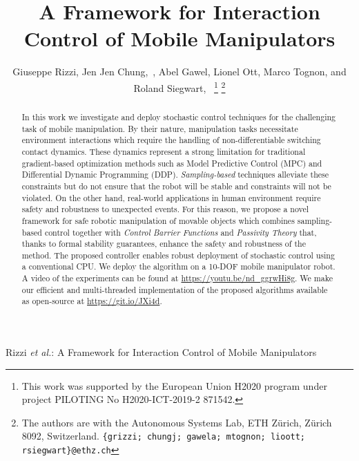 \documentclass[journal]{IEEEtran}  %
\begin{document}
\title{
A Framework for Interaction Control of Mobile Manipulators
}


\author{Giuseppe Rizzi, Jen Jen Chung,~, Abel Gawel, Lionel Ott, Marco Tognon, and Roland Siegwart,~%
\thanks{This work was supported by the European Union H2020 program under project PILOTING No H2020-ICT-2019-2 871542.}
\thanks{The authors are with the Autonomous Systems Lab, ETH Z\"urich, Z\"urich 8092, Switzerland. {\tt\small\{grizzi; chungj; gawela; mtognon; lioott; rsiegwart\}@ethz.ch}}%
}

%                              
{Rizzi \MakeLowercase{\textit{et al.}}: A Framework for Interaction Control of Mobile Manipulators}




\maketitle


\begin{abstract}

In this work we investigate and deploy stochastic control techniques for the challenging task of mobile manipulation. By their nature, manipulation tasks necessitate environment interactions which require the handling of non-differentiable switching contact dynamics. These dynamics represent a strong limitation for traditional gradient-based optimization methods such as Model Predictive Control (MPC) and Differential Dynamic Programming (DDP). \emph{Sampling-based} techniques alleviate these constraints but do not ensure that the robot will be stable and constraints will not be violated. On the other hand, real-world applications in human environment require safety and robustness to unexpected events. For this reason, we propose a novel framework for safe robotic manipulation of movable objects which combines sampling-based control together with \emph{Control Barrier Functions} and \emph{Passivity Theory} that, thanks to formal stability guarantees, enhance the safety and robustness of the method. The proposed controller enables robust deployment of stochastic control using a conventional CPU. We deploy the algorithm on a 10-DOF mobile manipulator robot. A video of the experiments can be found at \url{https://youtu.be/nd_ggrwHi8g}. We make our efficient and multi-threaded implementation of the proposed algorithms available as open-source at \url{https://git.io/JXi4d}.
\end{abstract}
\end{document}
